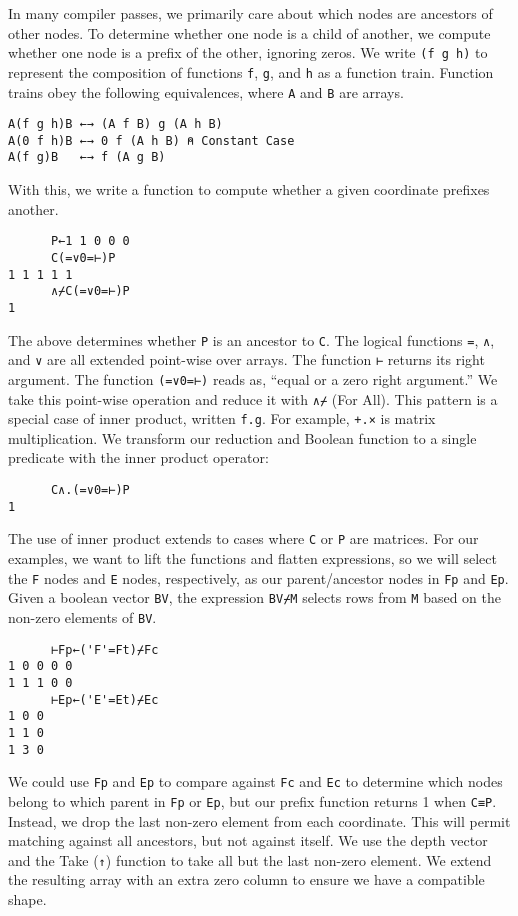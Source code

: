 \documentclass[numbers,preprint]{sigplanconf}
\begin{document}
\noindent
In many compiler passes, we primarily care about which nodes are ancestors 
of other nodes. To determine whether one node is a child of another, we compute 
whether one node is a prefix of the other, ignoring zeros.
We write \verb;(f g h); to represent the composition of functions \verb;f;, \verb;g;,
and \verb;h; as a function train.
Function trains obey the following equivalences, where \verb;A; and \verb;B;
are arrays.

\begin{verbatim}
A(f g h)B ←→ (A f B) g (A h B)
A(0 f h)B ←→ 0 f (A h B) ⍝ Constant Case
A(f g)B   ←→ f (A g B)
\end{verbatim}

\noindent
With this, we write a function to compute whether a given coordinate prefixes 
another.

\begin{verbatim}
      P←1 1 0 0 0
      C(=∨0=⊢)P
1 1 1 1 1
      ∧⌿C(=∨0=⊢)P
1
\end{verbatim}

\noindent
The above determines whether \verb;P; is an ancestor to \verb;C;.
The logical functions \verb;=;, \verb;∧;, and \verb;∨; are all extended 
point-wise over arrays.
The function \verb;⊢; returns its right argument.
The function \verb;(=∨0=⊢); reads as, ``equal or a zero right argument.'' 
We take this point-wise operation and reduce it with \verb;∧⌿; (For All).
This pattern is a special case of inner product, written \verb;f.g;. 
For example, \verb;+.×; is matrix multiplication. We transform our reduction and 
Boolean function to a single predicate with the inner product operator:
\begin{verbatim}
      C∧.(=∨0=⊢)P
1
\end{verbatim}

The use of inner product extends to cases where \verb;C; or \verb;P; are matrices.
For our examples, we want to lift the functions and flatten expressions, so we 
will select the \verb;F; nodes and \verb;E; nodes, respectively, as our 
parent/ancestor nodes in \verb;Fp; and \verb;Ep;. Given a boolean vector 
\verb;BV;, the expression \verb;BV⌿M; selects rows from \verb;M; based on the 
non-zero elements of \verb;BV;.

\begin{verbatim}
      ⊢Fp←('F'=Ft)⌿Fc
1 0 0 0 0
1 1 1 0 0
      ⊢Ep←('E'=Et)⌿Ec
1 0 0
1 1 0
1 3 0
\end{verbatim}

\noindent
We could use \verb;Fp; and \verb;Ep; to compare against \verb;Fc; and \verb;Ec;
to determine which nodes belong to which parent in \verb;Fp; or \verb;Ep;, 
but our prefix function returns 1 when \verb;C≡P;. 
Instead, we drop the last non-zero element from each coordinate.
This will permit matching against all ancestors, but not against itself.
We use the depth vector and the Take (\verb;↑;) function to take all but
the last non-zero element. We extend the resulting array with an extra 
zero column to ensure we have a compatible shape.
\end{document}
